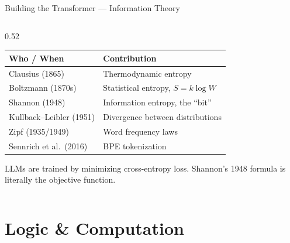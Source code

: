 \begin{frame}[shrink=15]{Building the Transformer --- Information Theory}
\begin{columns}[T]
    \begin{column}{0.52\textwidth}
      \begin{tcolorbox}[colback=aiViolet!5, colframe=aiViolet,
        fonttitle=\bfseries, title={Section 4 Summary},
        rounded corners, boxrule=1pt, left=4pt, right=4pt, top=3pt, bottom=3pt]
        \footnotesize
        \begin{tabular}{@{}ll@{}}
          \toprule
          \textbf{Who / When} & \textbf{Contribution}\\
          \midrule
          Clausius (1865) & Thermodynamic entropy\\
          Boltzmann (1870s) & Statistical entropy, $S = k\log W$\\
          Shannon (1948) & Information entropy, the ``bit''\\
          Kullback--Leibler (1951) & Divergence between distributions\\
          Zipf (1935/1949) & Word frequency laws\\
          Sennrich et al.\ (2016) & BPE tokenization\\
          \bottomrule
        \end{tabular}
      \end{tcolorbox}

      \vspace{0.3em}
      \begin{insightbox}
        LLMs are trained by minimizing cross-entropy loss.
        Shannon's 1948 formula is literally the objective function.
      \end{insightbox}
    \end{column}
  \end{columns}

\end{frame}


%
\section{Logic \& Computation}

